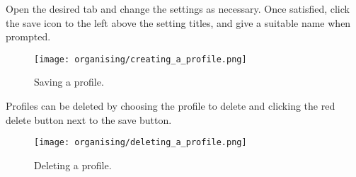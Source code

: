 Open the desired tab and change the settings as necessary.  Once satisfied, click the save icon to the left above the setting titles, and give a suitable name when prompted.

\begin{figure}[H]
\centering
\texttt{[image: organising/creating\_a\_profile.png]}
\caption{Saving a profile.}
\label{fig:creating_a_profile}
\end{figure}

Profiles can be deleted by choosing the profile to delete and clicking the red delete button next to the save button.

\begin{figure}[H]
\centering
\texttt{[image: organising/deleting\_a\_profile.png]}
\caption{Deleting a profile.}
\label{fig:deleting_a_profile}
\end{figure}



